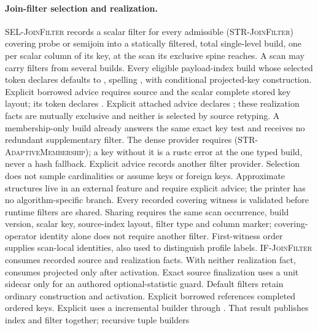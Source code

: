 \paragraph{Join-filter selection and realization.}
\textsc{SEL-JoinFilter} records a scalar filter for every admissible
(\textsc{STR-JoinFilter}) covering probe or semijoin into a statically filtered,
total single-level build, one per scalar column of its key, at the scan its
exclusive spine reaches. A scan may carry filters from several builds.
Every eligible payload-index build whose selected token declares
 defaults to , spelling
, with conditional projected-key construction.
Explicit borrowed advice requires source  and the scalar
complete stored key layout; its token declares .
Explicit attached advice declares ; these realization
facts are mutually exclusive and neither is selected by source retyping.
A membership-only build already answers
the same exact key test and receives no redundant supplementary filter.
The dense provider requires  (\textsc{STR-AdaptiveMembership});
a key without it is a rustc error at the one typed build, never a hash
fallback. Explicit  advice records another filter provider.
Selection does not sample cardinalities or assume keys or foreign keys.
Approximate structures live in an external feature and require explicit
 advice; the printer has no algorithm-specific branch.
Every recorded covering witness is validated before runtime filters are shared.
Sharing requires the same scan occurrence, build version, scalar key, source-index
layout, filter type and column marker; covering-operator identity alone does not
require another filter. First-witness order supplies scan-local identities, also
used to distinguish profile labels.
\textsc{IF-JoinFilter} consumes recorded source and realization facts.
With neither realization fact,  consumes projected
 only after activation. Exact source finalization uses
a unit sidecar only for an authored optional-statistic guard. Default filters
retain ordinary construction and  activation. Explicit borrowed  references completed ordered keys.
Explicit  uses a  incremental builder
through .
That result publishes index and filter together; recursive tuple builders
